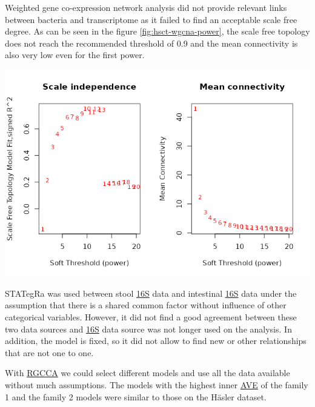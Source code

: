 \documentclass[
  12pt,
  a4paper,
  twoside,
  openright]{book}
\let\origfigure\figure
\let\endorigfigure\endfigure
\renewenvironment{figure}[1][2] {
    \expandafter\origfigure\expandafter[!htbp]
} {
    \endorigfigure
}
\begin{document}
Weighted gene co-expression network analysis did not provide relevant links between bacteria and transcriptome as it failed to find an acceptable scale free degree.
As can be seen in the figure \ref{fig:hsct-wgcna-power}, the scale free topology does not reach the recommended threshold of 0.9 and the mean connectivity is also very low even for the first power.

\begin{figure}
\includegraphics[width=1\linewidth]{images/hsct-wgcna-power} \caption[Power evaluation of WGCNA in the HSCT dataset.]{Power evaluation of WGCNA in the HSCT dataset. On the ordinate the power on the abscissa on the left the scale free topology model fit; on the right the mean connectivity. There is a low fit even on large power and the mean connectivity is below 100 from the very first value.}\label{fig:hsct-wgcna-power}
\end{figure}

STATegRa was used between stool \protect\hyperlink{acronyms_16S}{16S} data and intestinal \protect\hyperlink{acronyms_16S}{16S} data under the assumption that there is a shared common factor without influence of other categorical variables.
However, it did not find a good agreement between these two data sources and \protect\hyperlink{acronyms_16S}{16S} data source was not longer used on the analysis.
In addition, the model is fixed, so it did not allow to find new or other relationships that are not one to one.

With \protect\hyperlink{acronyms_RGCCA}{RGCCA} we could select different models and use all the data available without much assumptions.
The models with the highest inner \protect\hyperlink{acronyms_AVE}{AVE} of the family 1 and the family 2 models were similar to those on the Häsler dataset.
\end{document}
